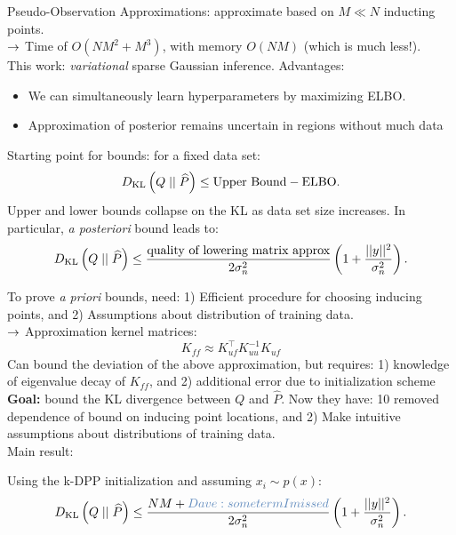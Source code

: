 Pseudo-Observation Approximations: approximate based on $M \ll N$ inducting points. \\
$\rightarrow$ Time of $O(NM^2 + M^3)$, with memory $O(NM)$ (which is much less!). \\

This work: {\it variational} sparse Gaussian inference. Advantages: 
\begin{itemize}
    \item We can simultaneously learn hyperparameters by maximizing ELBO.
    \item Approximation of posterior remains uncertain in regions without much data
\end{itemize}


Starting point for bounds: for a fixed data set:
\[
D_{\text{KL}}\left(Q \mid \mid \widehat{P}\right) \leq \text{Upper Bound} - \text{ELBO}.
\]
Upper and lower bounds collapse on the KL as data set size increases. In particular, {\it a posteriori} bound leads to:
\[
D_{\text{KL}}\left(Q \mid \mid \widehat{P}\right) \leq \frac{\text{quality of lowering matrix approx}}{2\sigma_n^2} \left(1 + \frac{||y||^2}{\sigma_n^2}\right).
\]


To prove {\it a priori} bounds, need: 1) Efficient procedure for choosing inducing points, and 2) Assumptions about distribution of training data. \\

$\rightarrow$ Approximation kernel matrices:
\[
K_{ff} \approx K_{uf}^\top K_{uu}^{-1} K_{uf}
\]
Can bound the deviation of the above approximation, but requires: 1) knowledge of eigenvalue decay of $K_{ff}$, and 2) additional error due to initialization scheme \\

{\bf Goal:} bound the KL divergence between $Q$ and $\widehat{P}$. Now they have: 10 removed dependence of bound on inducing point locations, and 2) Make intuitive assumptions about distributions of training data. \\

Main result:
\begin{theorem}
Using the k-DPP initialization and assuming $x_i \sim p(x)$:
\[
\KL{Q}{\widehat{P}} \leq \frac{NM + \dnote{some term I missed}}{2\sigma_n^2} \left(1 + \frac{||y||^2}{\sigma_n^2}\right).
\]
\end{theorem}


